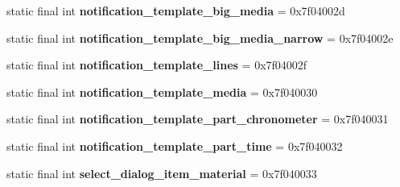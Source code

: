 \begin{DoxyCompactItemize}
\item 
\hypertarget{classandroid_1_1support_1_1v7_1_1appcompat_1_1_r_1_1layout_abc3d68ba9164e5339eb30ac8d1fcc032}{}static final int {\bfseries notification\+\_\+template\+\_\+big\+\_\+media} = 0x7f04002d\label{classandroid_1_1support_1_1v7_1_1appcompat_1_1_r_1_1layout_abc3d68ba9164e5339eb30ac8d1fcc032}

\item 
\hypertarget{classandroid_1_1support_1_1v7_1_1appcompat_1_1_r_1_1layout_adb6b83ae65b94247d0c806e75af83190}{}static final int {\bfseries notification\+\_\+template\+\_\+big\+\_\+media\+\_\+narrow} = 0x7f04002e\label{classandroid_1_1support_1_1v7_1_1appcompat_1_1_r_1_1layout_adb6b83ae65b94247d0c806e75af83190}

\item 
\hypertarget{classandroid_1_1support_1_1v7_1_1appcompat_1_1_r_1_1layout_ac39979905cd11fc790ab4ff2498965bc}{}static final int {\bfseries notification\+\_\+template\+\_\+lines} = 0x7f04002f\label{classandroid_1_1support_1_1v7_1_1appcompat_1_1_r_1_1layout_ac39979905cd11fc790ab4ff2498965bc}

\item 
\hypertarget{classandroid_1_1support_1_1v7_1_1appcompat_1_1_r_1_1layout_a61744f22e936099b070df0771b4b1fee}{}static final int {\bfseries notification\+\_\+template\+\_\+media} = 0x7f040030\label{classandroid_1_1support_1_1v7_1_1appcompat_1_1_r_1_1layout_a61744f22e936099b070df0771b4b1fee}

\item 
\hypertarget{classandroid_1_1support_1_1v7_1_1appcompat_1_1_r_1_1layout_a40ec1f0c58d5ef14dcdabd2917b39098}{}static final int {\bfseries notification\+\_\+template\+\_\+part\+\_\+chronometer} = 0x7f040031\label{classandroid_1_1support_1_1v7_1_1appcompat_1_1_r_1_1layout_a40ec1f0c58d5ef14dcdabd2917b39098}

\item 
\hypertarget{classandroid_1_1support_1_1v7_1_1appcompat_1_1_r_1_1layout_a45b077fa0a865191a582090d784b1163}{}static final int {\bfseries notification\+\_\+template\+\_\+part\+\_\+time} = 0x7f040032\label{classandroid_1_1support_1_1v7_1_1appcompat_1_1_r_1_1layout_a45b077fa0a865191a582090d784b1163}

\item 
\hypertarget{classandroid_1_1support_1_1v7_1_1appcompat_1_1_r_1_1layout_ac19040d9099a5f9d5427814ac4a16e37}{}static final int {\bfseries select\+\_\+dialog\+\_\+item\+\_\+material} = 0x7f040033\label{classandroid_1_1support_1_1v7_1_1appcompat_1_1_r_1_1layout_ac19040d9099a5f9d5427814ac4a16e37}


\end{DoxyCompactItemize}
